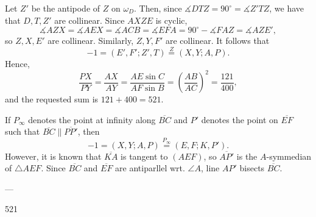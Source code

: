 Let $Z'$ be the antipode of $Z$ on $\omega_D$. Then, since $\measuredangle DTZ=90^\circ=\measuredangle Z'TZ$, we have that $D,T,Z'$ are collinear. Since $AXZE$ is cyclic, \[\measuredangle AZX=\measuredangle AEX=\measuredangle ACB=\measuredangle EFA=90^\circ-\measuredangle FAZ=\measuredangle AZE',\]
so $Z,X,E'$ are collinear. Similarly, $Z,Y,F'$ are collinear. It follows that \[-1=(E',F';Z',T)\stackrel Z=(X,Y;A,P).\]
Hence, \[\frac{PX}{PY}=\frac{AX}{AY}=\frac{AE\sin C}{AF\sin B}=\left(\frac{AB}{AC}\right)^2=\frac{121}{400},\]
and the requested sum is $121+400=521$.

\begin{boxremark}
    If $P_\infty$ denotes the point at infinity along $\overline{BC}$ and $P'$ denotes the point on $\overline{EF}$ such that $\overline{BC}\parallel\overline{PP'}$, then \[-1=(X,Y;A,P)\stackrel{P_\infty}=(E,F;K,P').\]
    However, it is known that $\overline{KA}$ is tangent to $(AEF)$, so $\overline{AP'}$ is the $A$-symmedian of $\triangle AEF$. Since $\overline{BC}$ and $\overline{EF}$ are antiparllel wrt. $\angle A$, line $AP'$ bisects $\overline{BC}$.
\end{boxremark}

---

521
